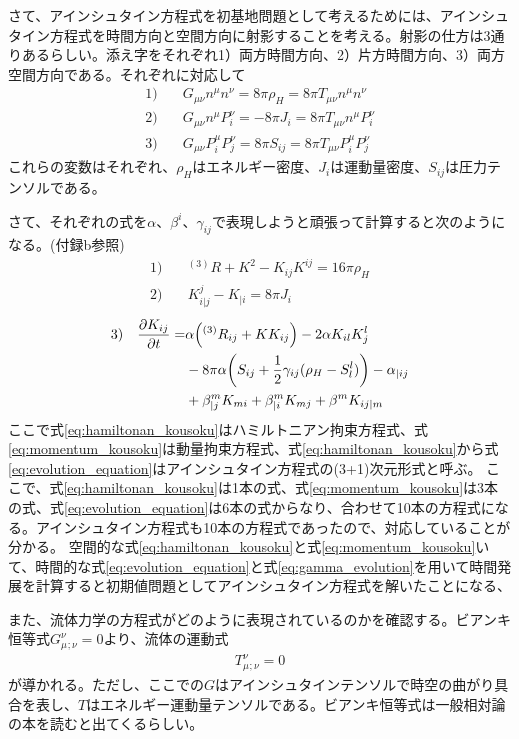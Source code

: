 \documentclass[autodetect-engine,dvi=dvipdfmx,ja=standard, 10pt, a4paper]{bxjsarticle}
\begin{document}
さて、アインシュタイン方程式を初基地問題として考えるためには、アインシュタイン方程式を時間方向と空間方向に射影することを考える。射影の仕方は3通りあるらしい。添え字をそれぞれ1）両方時間方向、2）片方時間方向、3）両方空間方向である。それぞれに対応して
\begin{align}
	1) \quad & G_{\mu\nu}n^\mu n^\nu = 8\pi \rho_H = 8\pi T_{\mu\nu}n^\mu n^\nu\label{eq:energy_constraint}\\
	2) \quad & G_{\mu\nu}n^\mu P^\nu_i = -8\pi J_i = 8\pi T_{\mu\nu}n^\mu P^\nu_i\label{eq:momentum_constraint}\\
	3) \quad & G_{\mu\nu}P^\mu_i P^\nu_j = 8\pi S_{ij} = 8\pi T_{\mu\nu}P^\mu_i P^\nu_j\label{eq:space_space}
\end{align}
これらの変数はそれぞれ、$\rho_H$はエネルギー密度、$J_i$は運動量密度、$S_{ij}$は圧力テンソルである。

さて、それぞれの式を$\alpha$、$\beta^i$、$\gamma_{ij}$で表現しようと頑張って計算すると次のようになる。(付録b参照)
\begin{align}
	1) \quad & ^{(3)}R + K^2 - K_{ij}K^{ij} = 16\pi \rho_H
	\label{eq:hamiltonan_kousoku}\\
	2) \quad & K^j_{i|j} - K_{|i} = 8\pi J_i
	\label{eq:momentum_kousoku}
\end{align}
\begin{align}
	3) \quad  \pdv{K_{ij}}{t} = & \alpha \qty(^{(3)}R_{ij} + K K_{ij} ) -2\alpha K_{il}K^l_j\nonumber\\
	& -8\pi\alpha\qty( S_{ij} + \frac{1}{2}\gamma_{ij}(\rho_H-S^l_l)) -\alpha_{|ij} \\
	& + \beta^m_{|j} K_{mi} + \beta^m_{|i} K_{mj} + \beta^m K_{ij|m}
	\label{eq:evolution_equation}
\end{align}
ここで式\eqref{eq:hamiltonan_kousoku}はハミルトニアン拘束方程式、式\eqref{eq:momentum_kousoku}は動量拘束方程式、式\eqref{eq:hamiltonan_kousoku}から式\eqref{eq:evolution_equation}はアインシュタイン方程式の(3+1)次元形式と呼ぶ。
ここで、式\eqref{eq:hamiltonan_kousoku}は1本の式、式\eqref{eq:momentum_kousoku}は3本の式、式\eqref{eq:evolution_equation}は6本の式からなり、合わせて10本の方程式になる。アインシュタイン方程式も10本の方程式であったので、対応していることが分かる。
空間的な式\eqref{eq:hamiltonan_kousoku}と式\eqref{eq:momentum_kousoku}いて、時間的な式\eqref{eq:evolution_equation}と式\eqref{eq:gamma_evolution}を用いて時間発展を計算すると初期値問題としてアインシュタイン方程式を解いたことになる、

また、流体力学の方程式がどのように表現されているのかを確認する。ビアンキ恒等式$G_{\mu}^{\nu}{}_{;\nu}=0$より、流体の運動式
\begin{align}
	T_{\mu}^{\nu}{}_{;\nu} = 0\label{eq:fluid_equation_tensor}
\end{align}
が導かれる。ただし、ここでの$G$はアインシュタインテンソルで時空の曲がり具合を表し、$T$はエネルギー運動量テンソルである。ビアンキ恒等式は一般相対論の本を読むと出てくるらしい。
\end{document}
